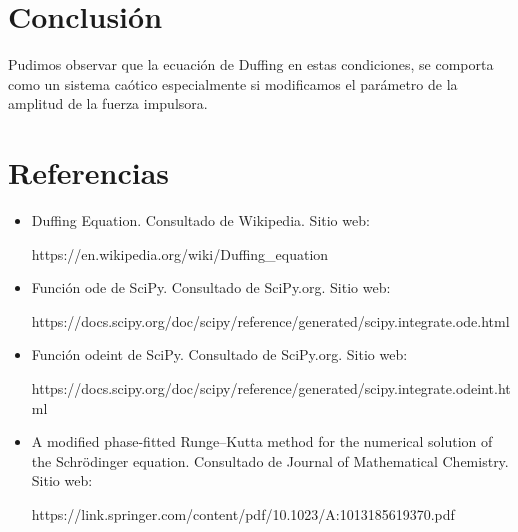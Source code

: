 \documentclass{article}
\begin{document}
\section{Conclusión}
Pudimos observar que la ecuación de Duffing en estas condiciones, se comporta como un sistema caótico especialmente si modificamos el parámetro de la amplitud de la fuerza impulsora.

\section{Referencias}
\begin{itemize}
    \item Duffing Equation. Consultado de Wikipedia. Sitio web:
    
    https://en.wikipedia.org/wiki/Duffing\_equation
    
    \item Función ode de SciPy. Consultado de SciPy.org. Sitio web:
    
    https://docs.scipy.org/doc/scipy/reference/generated/scipy.integrate.ode.html
    
    \item Función odeint de SciPy. Consultado de SciPy.org. Sitio web:
    
    https://docs.scipy.org/doc/scipy/reference/generated/scipy.integrate.odeint.html
    
    \item A modified phase-fitted Runge–Kutta method for the numerical solution of the Schrödinger equation. Consultado de Journal of Mathematical Chemistry. Sitio web:
    
    https://link.springer.com/content/pdf/10.1023/A:1013185619370.pdf
\end{itemize}
\end{document}
